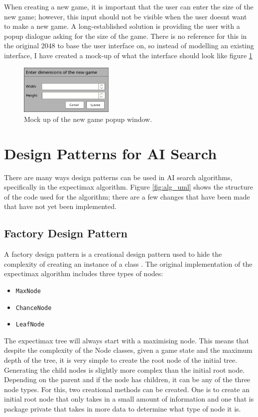 \documentclass{article}
\begin{document}
When creating a new game, it is important that the user can enter the size of the new game; however, this input should not be visible when the user doesn\textquotesingle t want to make a new game. A long-established solution is providing the user with a popup dialogue asking for the size of the game. There is no reference for this in the original 2048 to base the user interface on, so instead of modelling an existing interface, I have created a mock-up of what the interface should look like figure \ref{fig:popup}

\begin{figure}
    \centering
    \includegraphics[width=0.4\textwidth]{newGamePopup.png}
    \caption{Mock up of the new game popup window.}
    \label{fig:popup}
\end{figure}
\section{Design Patterns for AI Search}
\label{sec:dp}
There are many ways design patterns can be used in AI search algorithms, specifically in the expectimax algorithm. Figure \ref{fig:alg_uml} shows the structure of the code used for the algorithm; there are a few changes that have been made that have not yet been implemented.


\subsection{Factory Design Pattern}
\label{subsec:factory}
A factory design pattern is a creational design pattern used to hide the complexity of creating an instance of a class \cite{CS2800_creational}. The original implementation of the expectimax algorithm includes three types of nodes:
\begin{itemize}
    \item \texttt{MaxNode}
    \item \texttt{ChanceNode}
    \item \texttt{LeafNode}
\end{itemize}
The  expectimax tree will always start with a maximising node. This means that despite the complexity of the Node classes, given a game state and the maximum depth of the tree, it is very simple to create the root node of the initial tree. Generating the child nodes is slightly more complex than the initial root node. Depending on the parent and if the node has children, it can be any of the three node types. For this, two creational methods can be created. One is to create an initial root node that only takes in a small amount of information and one that is package private that takes in more data to determine what type of node it is.
\end{document}
